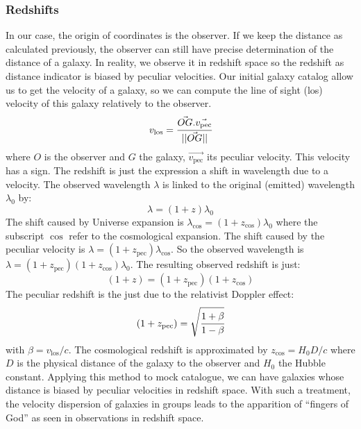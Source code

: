 \subsubsection{Redshifts}
%
In our case, the origin of coordinates is the observer. If we keep the distance
as calculated previously, the observer can still have precise determination of
the distance of a galaxy. In reality, we observe it in redshift space so the
redshift as distance indicator is biased by peculiar velocities. Our initial
galaxy catalog allow us to get the velocity of a galaxy, so we can compute the
line of sight (los) velocity of this galaxy relatively to the observer.
%
\begin{equation}
    v_{\mathrm{los}}=\cfrac{\vec{OG}.\vec{v_{\mathrm{pec}}}}{||\vec{OG}||}
\end{equation}
%
where $O$ is the observer and $G$ the galaxy, $\vec{v_{\mathrm{pec}}}$ its
peculiar velocity. This velocity has a sign. The redshift is just the
expression a shift in wavelength due to a velocity. The observed wavelength
$\lambda$ is linked to the original (emitted) wavelength $\lambda_0$ by:
%
\begin{equation}
    \lambda=(1+z)\lambda_0
\end{equation}
%
The shift caused by Universe expansion is
$\lambda_{\cos}=(1+z_{\cos})\lambda_0$ where the subscript $\cos$ refer to
the cosmological expansion. The shift caused by the peculiar velocity is
$\lambda=(1+z_{\mathrm{pec}})\lambda_{\cos}$. So the observed wavelength is
$\lambda=(1+z_{\mathrm{pec}})(1+z_{\cos})\lambda_0$. The resulting observed
redshift is just:
%
\begin{equation}
    (1+z)=(1+z_{\mathrm{pec}})(1+z_{\cos})
\end{equation}
%
The peculiar redshift is the just due to the relativist Doppler effect:
%
\begin{equation}
    (1+z_{\mathrm{pec}})=\sqrt{\cfrac{1+\beta}{1-\beta}}
\end{equation}
%
with $\beta={v_{\mathrm{los}}}/{c}$. The cosmological redshift is
approximated by $z_{\cos}={H_0}{D}/c$ where $D$ is the physical distance of
the galaxy to the observer and $H_0$ the Hubble constant.
%
%
Applying this method to mock catalogue, we can have galaxies whose distance
is biased by peculiar velocities in redshift space. With such a treatment,
the velocity dispersion of galaxies in groups leads to the apparition of
``fingers of God'' as seen in observations in redshift space.
%
